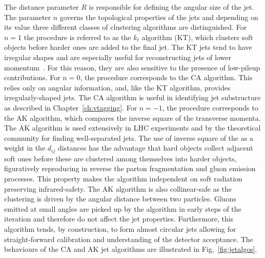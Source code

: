 The distance parameter $R$ is responsible for defining the angular size of the jet. The parameter $n$ governs the topological properties of the jets and depending on its value three different classes of clustering algorithms are distinguished. For $n = 1$ the procedure is referred to as the $k_t$ algorithm (KT), which clusters soft objects before harder ones are added to the final jet. The KT jets tend to have irregular shapes and are especially useful for reconstructing jets of lower momentum~\cite{Cacciari:2008gp}. For this reason, they are also sensitive to the presence of low-\pt pileup contributions.
For $n = 0$, the procedure corresponds to the CA algorithm. This relies only on angular information, and, like the KT algorithm, provides irregularly-shaped jets. The CA algorithm is useful in identifying jet substructure as described in Chapter~\ref{ch:vtagging}. For $n = -1$, the procedure corresponds to the AK algorithm, which compares the inverse square of the transverse momenta.
The AK algorithm is used extensively in LHC experiments and by the theoretical community for finding well-separated jets. The use of inverse square of the \pt as a weight in the $d_{ij}$ distances has the advantage that hard objects collect adjacent soft ones before these are clustered among themselves into harder objects, figuratively reproducing in reverse the parton fragmentation and gluon emission processes.
This property makes the algorithm independent on soft radiation preserving infrared-safety. The AK algorithm is also collinear-safe as the clustering is driven by the angular distance between two particles. Gluons emitted at small angles are picked up by the algorithm in early steps of the iteration and therefore do not affect the jet properties. Furthermore, this algorithm tends, by construction, to form almost circular jets allowing for straight-forward calibration and understanding of the detector acceptance. The behaviours of the CA and AK jet algorithms are illustrated in Fig,~\ref{fig:jetalgos}. 
